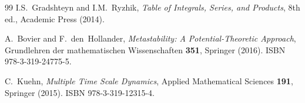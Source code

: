 \documentclass[11pt,a4paper]{article}
\theoremstyle{plain}
\theoremstyle{definition}
\begin{document}
\begin{thebibliography}{99}
 I.S.~Gradshteyn and I.M.~Ryzhik, \textit{Table of Integrals, Series, and Products}, 8th ed., Academic Press (2014).

 A.~Bovier and F.~den~Hollander, \textit{Metastability: A Potential-Theoretic Approach}, Grundlehren der mathematischen Wissenschaften \textbf{351}, Springer (2016). ISBN 978-3-319-24775-5.

 C.~Kuehn, \textit{Multiple Time Scale Dynamics}, Applied Mathematical Sciences \textbf{191}, Springer (2015). ISBN 978-3-319-12315-4.
\end{thebibliography}
\end{document}
